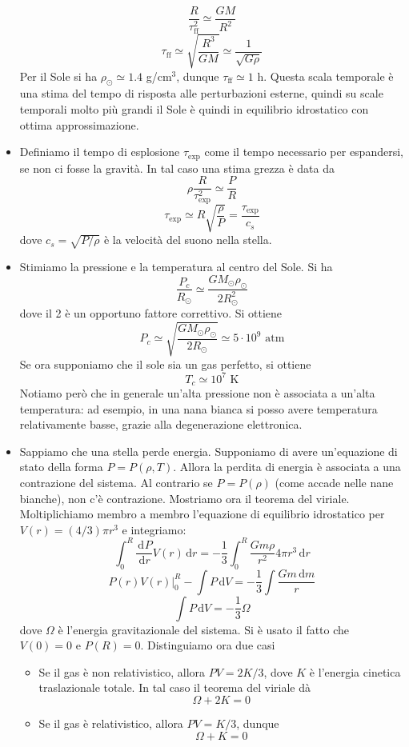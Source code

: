 \documentclass[a4paper,11pt]{article}
\renewcommand{\d}{\mathrm{d}} %
\newcommand{\der}[3][]{\frac{\d ^{#1}#2}{\d {#3}^{#1}}} %
\newcommand{\s}{_\odot}
\renewcommand{\d}{\,\mathrm{d}}
\theoremstyle{theorem}
\theoremstyle{definition}
\begin{document}
\begin{itemize}
		\[\frac{R}{\tau_{\textrm{ff}}^2}\simeq\frac{GM}{R^2}\]
		\[\tau_{\textrm{ff}}\simeq\sqrt{\frac{R^3}{GM}}\simeq\frac{1}{\sqrt{G\rho}}\]
		Per il Sole si ha $\rho\s\simeq 1.4$ g/cm$^3$, dunque $\tau_{\textrm{ff}}\simeq 1$ h. Questa scala temporale è una stima del tempo di risposta alle perturbazioni esterne, quindi su scale temporali molto più grandi il Sole è quindi in equilibrio idrostatico con ottima approssimazione.
		\item Definiamo il tempo di esplosione $\tau_\textrm{exp}$ come il tempo necessario per espandersi, se non ci fosse la gravità. In tal caso una stima grezza è data da
		\[\rho\frac{R}{\tau_\textrm{exp}^2}\simeq \frac{P}{R}\]
		\[\tau_\textrm{exp}\simeq R\sqrt{\frac{\rho}{P}}=\frac{\tau_\textrm{exp}}{c_s}\]
		dove $c_s=\sqrt{P/\rho}$ è la velocità del suono nella stella.
		\item Stimiamo la pressione e la temperatura al centro del Sole. Si ha 
		\[\frac{P_c}{R\s}\simeq\frac{GM\s\rho\s}{2R\s^2}\]
		dove il 2 è un opportuno fattore correttivo. Si ottiene
		\[P_c\simeq\sqrt{\frac{GM\s\rho\s}{2R\s}}\simeq5\cdot10^9\textrm{ atm}\]
		Se ora supponiamo che il sole sia un gas perfetto, si ottiene
		\[T_c\simeq10^7\textrm{ K}\]
		Notiamo però che in generale un'alta pressione non è associata a un'alta temperatura: ad esempio, in una nana bianca si posso avere temperatura relativamente basse, grazie alla degenerazione elettronica.
		\item Sappiamo che una stella perde energia. Supponiamo di avere un'equazione di stato della forma $P=P(\rho,T)$. Allora la perdita di energia è associata a una contrazione del sistema. Al contrario se $P=P(\rho)$ (come accade nelle nane bianche), non c'è contrazione. Mostriamo ora il teorema del viriale. Moltiplichiamo membro a membro l'equazione di equilibrio idrostatico per $V(r)=(4/3)\pi r^3$ e integriamo:
		\[\int_{0}^{R}\der{P}{r}V(r)\d r=-\frac{1}{3}\int_{0}^{R}\frac{Gm\rho}{r^2}4\pi r^3\d r\]
		\[\left.P(r)V(r)\right|_{0}^{R}-\int P\d V=-\frac{1}{3}\int\frac{Gm\d m}{r}\]
		\[\int P\d V=-\frac{1}{3}\Omega\]
		dove $\Omega$ è l'energia gravitazionale del sistema. Si è usato il fatto che $V(0)=0$ e $P(R)=0$. Distinguiamo ora due casi
		\begin{itemize}
			\item Se il gas è non relativistico, allora $PV=2K/3$, dove $K$ è l'energia cinetica traslazionale totale. In tal caso il teorema del viriale dà
			\[\Omega+2K=0\]
			\item Se il gas è relativistico, allora $PV=K/3$, dunque
			\[\Omega+K=0\]

\end{itemize}
\end{itemize}
\end{document}
